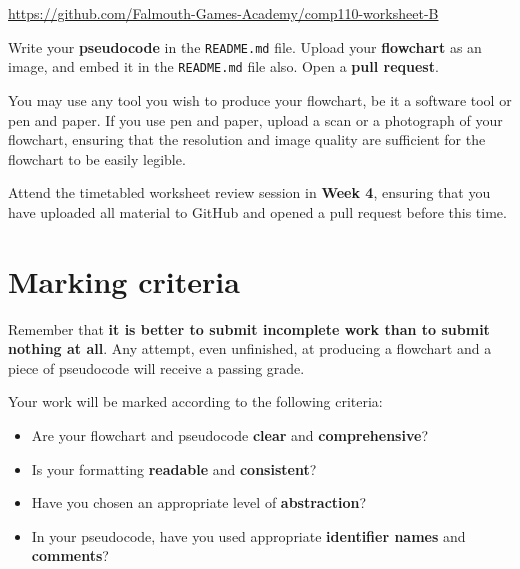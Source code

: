 \documentclass{../../../fal_assignment}
\begin{document}
\url{https://github.com/Falmouth-Games-Academy/comp110-worksheet-B}

Write your \textbf{pseudocode} in the \texttt{README.md} file.
Upload your \textbf{flowchart} as an image, and embed it in the \texttt{README.md} file also.
Open a \textbf{pull request}.

You may use any tool you wish to produce your flowchart,
be it a software tool or pen and paper.
If you use pen and paper, upload a scan or a photograph of your flowchart,
ensuring that the resolution and image quality are sufficient for the flowchart to be easily legible.

Attend the timetabled worksheet review session in \textbf{Week 4},
ensuring that you have uploaded all material to GitHub and opened a pull request before this time.

\section*{Marking criteria}

Remember that \textbf{it is better to submit incomplete work than to submit nothing at all}.
Any attempt, even unfinished, at producing a flowchart and a piece of pseudocode will receive a passing grade.

Your work will be marked according to the following criteria:
\begin{itemize}
	\item Are your flowchart and pseudocode \textbf{clear} and \textbf{comprehensive}?
	\item Is your formatting \textbf{readable} and \textbf{consistent}?
	\item Have you chosen an appropriate level of \textbf{abstraction}?
	\item In your pseudocode, have you used appropriate \textbf{identifier names} and \textbf{comments}?
\end{itemize}
\end{document}
